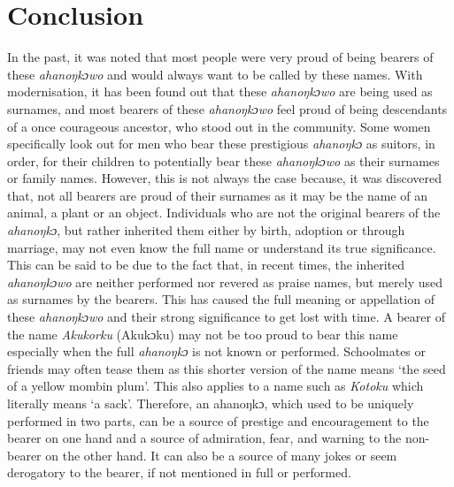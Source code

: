 \documentclass[output=paper]{langscibook}
\begin{document}
\section{Conclusion}
In the past, it was noted that most people were very proud of being bearers of these {\textit{ahanoŋkɔwo}} and would always want to be called by these names. With modernisation, it has been found out that these {\textit{ahanoŋkɔwo}} are being used as surnames, and most bearers of these {\textit{ahanoŋkɔwo}} feel proud of being descendants of a once courageous ancestor, who stood out in the community. Some women specifically look out for men who bear these prestigious {\textit{ahanoŋkɔ}} as suitors, in order, for their children to potentially bear these {\textit{ahanoŋkɔwo}} as their surnames or family names. However, this is not always the case because, it was discovered that, not all bearers are proud of their surnames as it may be the name of an animal, a plant or an object. Individuals who are not the original bearers of the {\textit{ahanoŋkɔ}}, but rather inherited them either by birth, adoption or through marriage, may not even know the full name or understand its true significance. This can be said to be due to the fact that, in recent times, the inherited {\textit{ahanoŋkɔwo}} are neither performed nor revered as praise names, but merely used as surnames by the bearers.  This has caused the full meaning or appellation of these {\textit{ahanoŋkɔwo}} and their strong significance to get lost with time. A bearer of the name {\textit{Akukorku}} (Akukɔku) may not be too proud to bear this name especially when the full {\textit{ahanoŋkɔ}} is not known or performed. Schoolmates or friends may often tease them as this shorter version of the name means ‘the seed of a yellow mombin plum’. This also applies to a name such as {\textit{Kotoku}} which literally means ‘a sack’. Therefore, an ahanoŋkɔ, which used to be uniquely performed in two parts, can be a source of prestige and encouragement to the bearer on one hand and a source of admiration, fear, and warning to the non-bearer on the other hand. It can also be a source of many jokes or seem derogatory to the bearer, if not mentioned in full or performed.

{\sloppy\printbibliography[heading=subbibliography,notkeyword=this]}
\end{document}
